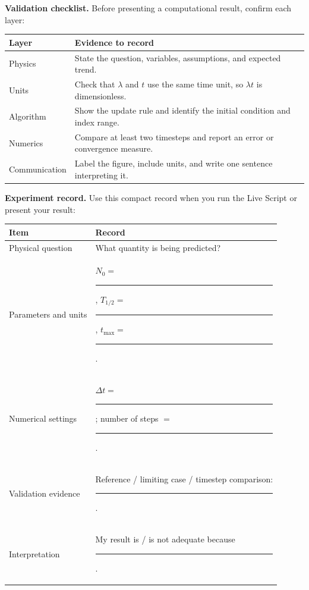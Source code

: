 \documentclass[11pt,a4paper]{article}
\begin{document}
\textbf{Validation checklist.} Before presenting a computational result, confirm each layer:
\begin{center}
\small
\begin{tabular}{>{\raggedright\arraybackslash}p{.23\linewidth}>{\raggedright\arraybackslash}p{.62\linewidth}}
\toprule
\textbf{Layer} & \textbf{Evidence to record}\\ \midrule
Physics & State the question, variables, assumptions, and expected trend.\\
Units & Check that $\lambda$ and $t$ use the same time unit, so $\lambda t$ is dimensionless.\\
Algorithm & Show the update rule and identify the initial condition and index range.\\
Numerics & Compare at least two timesteps and report an error or convergence measure.\\
Communication & Label the figure, include units, and write one sentence interpreting it.\\ \bottomrule
\end{tabular}
\end{center}

\textbf{Experiment record.} Use this compact record when you run the Live Script or present your result:
\begin{center}
\small
\begin{tabular}{>{\raggedright\arraybackslash}p{.27\linewidth}>{\raggedright\arraybackslash}p{.58\linewidth}}
\toprule
\textbf{Item} & \textbf{Record}\\ \midrule
Physical question & What quantity is being predicted?\\
Parameters and units & $N_0=$\rule{18mm}{0.3pt}, $T_{1/2}=$\rule{15mm}{0.3pt}, $t_{\max}=$\rule{15mm}{0.3pt}.\\
Numerical settings & $\Delta t=$\rule{15mm}{0.3pt}; number of steps $=$\rule{15mm}{0.3pt}.\\
Validation evidence & Reference / limiting case / timestep comparison: \rule{35mm}{0.3pt}.\\
Interpretation & My result is / is not adequate because \rule{28mm}{0.3pt}.\\ \bottomrule
\end{tabular}
\end{center}
\end{document}
